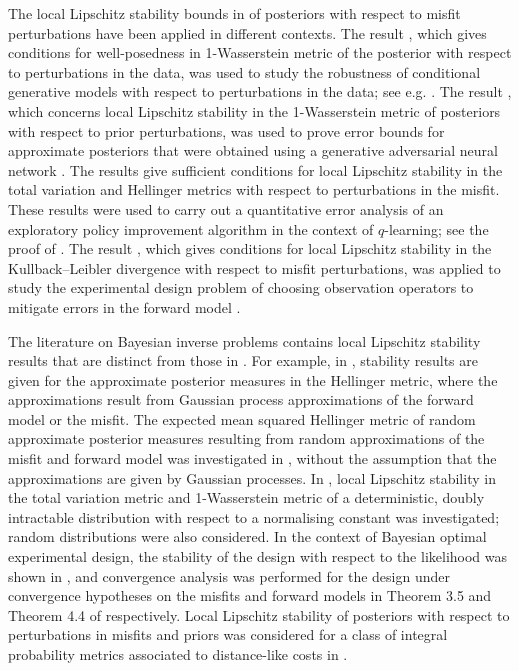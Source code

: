 \documentclass[a4paper]{scrartcl}
\theoremstyle{definition}
\numberwithin{equation}{section}
\begin{document}
The local Lipschitz stability bounds in \cite{Sprungk2020} of posteriors with respect to misfit perturbations have been applied in different contexts. 
The result \cite[Corollary 19]{Sprungk2020}, which gives conditions for well-posedness in 1-Wasserstein metric of the posterior with respect to perturbations in the data, was used to study the robustness of conditional generative models with respect to perturbations in the data; see e.g. \cite[Lemma 3]{Altekrueger2023}. 
The result \cite[Theorem 15]{Sprungk2020}, which concerns local Lipschitz stability in the 1-Wasserstein metric of posteriors with respect to prior perturbations, was used to prove error bounds for approximate posteriors that were obtained using a generative adversarial neural network \cite[Theorem 2]{Mucke2023}.
The results \cite[Theorem 5, Theorem 8]{Sprungk2020} give sufficient conditions for local Lipschitz stability in the total variation and Hellinger metrics with respect to perturbations in the misfit.
These results were used to carry out a quantitative error analysis of an exploratory policy improvement algorithm in the context of $q$-learning; see the proof of \cite[Lemma 3.5]{Tang2024}.
The result \cite[Theorem 11]{Sprungk2020}, which gives conditions for local Lipschitz stability in the Kullback--Leibler divergence with respect to misfit perturbations, was applied to study the experimental design problem of choosing observation operators to mitigate errors in the forward model \cite[Theorem 2.1]{Cvetkovic2024}.

The literature on Bayesian inverse problems contains local Lipschitz stability results that are distinct from those in \cite{Sprungk2020}.
For example, in \cite[Section 4]{Teckentrup2018}, stability results are given for the approximate posterior measures in the Hellinger metric, where the approximations result from Gaussian process approximations of the forward model or the misfit.
The expected mean squared Hellinger metric of random approximate posterior measures resulting from random approximations of the misfit and forward model was investigated in \cite{LieSullivanTeckentrup2018}, without the assumption that the approximations are given by Gaussian processes. 
In \cite{Habeck2020}, local Lipschitz stability in the total variation metric and 1-Wasserstein metric of a deterministic, doubly intractable distribution with respect to a normalising constant was investigated; random distributions were also considered.
In the context of Bayesian optimal experimental design, the stability of the design with respect to the likelihood was shown in \cite[Proposition 3.3]{Duong2023}, and convergence analysis was performed for the design under convergence hypotheses on the misfits and forward models in Theorem 3.5 and Theorem 4.4 of \cite{Duong2023} respectively.
Local Lipschitz stability of posteriors with respect to perturbations in misfits and priors was considered for a class of integral probability metrics associated to distance-like costs in \cite[Section 3]{Garbunoinigo2023}.
\end{document}
